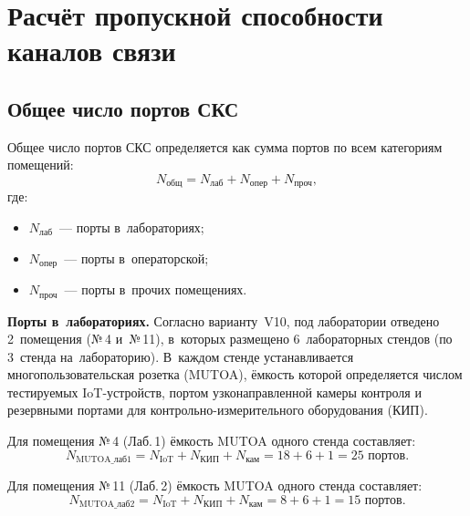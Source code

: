 \documentclass[a4paper,oneside,14pt]{extreport}
\begin{document}

\chapter{Расчёт пропускной способности каналов связи}

\section{Общее число портов СКС}

Общее число портов СКС определяется как сумма портов по всем категориям помещений:
\begin{equation}
    N_{\text{общ}} = N_{\text{лаб}} + N_{\text{опер}} + N_{\text{проч}},
    \label{eq:n_total}
\end{equation}
где:
\begin{itemize}
    \item $N_{\text{лаб}}$~--- порты в~лабораториях;
    \item $N_{\text{опер}}$~--- порты в~операторской;
    \item $N_{\text{проч}}$~--- порты в~прочих помещениях.
\end{itemize}

\textbf{Порты в~лабораториях.} Согласно варианту~V10, под лаборатории отведено 2~помещения (№\,4 и~№\,11), в~которых размещено 6~лабораторных стендов (по 3~стенда на~лабораторию). В~каждом стенде устанавливается многопользовательская розетка (MUTOA), ёмкость которой определяется числом тестируемых IoT-устройств, портом узконаправленной камеры контроля и резервными портами для контрольно-измерительного оборудования (КИП).

Для помещения №\,4 (Лаб.\,1) ёмкость MUTOA одного стенда составляет:
\begin{equation}
    N_{\text{MUTOA\_лаб1}} = N_{\text{IoT}} + N_{\text{КИП}} + N_{\text{кам}} = 18 + 6 + 1 = 25 \text{ портов}.
    \label{eq:mutoa_lab1}
\end{equation}

Для помещения №\,11 (Лаб.\,2) ёмкость MUTOA одного стенда составляет:
\begin{equation}
    N_{\text{MUTOA\_лаб2}} = N_{\text{IoT}} + N_{\text{КИП}} + N_{\text{кам}} = 8 + 6 + 1 = 15 \text{ портов}.
    \label{eq:mutoa_lab2}
\end{equation}
\end{document}
